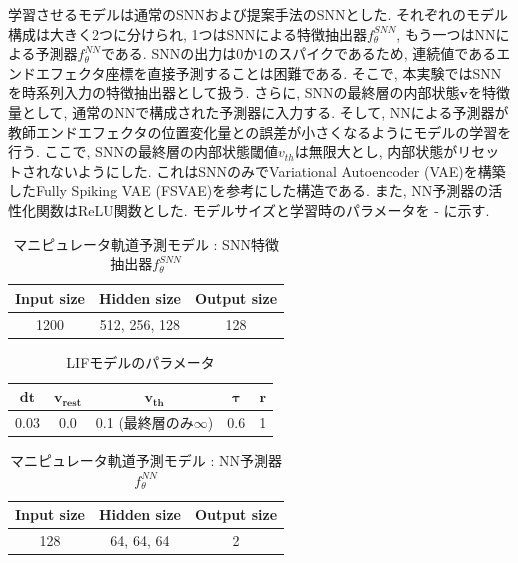 学習させるモデルは通常のSNNおよび提案手法のSNNとした.
それぞれのモデル構成は大きく2つに分けられ, 1つはSNNによる特徴抽出器$f_{\theta}^{SNN}$, もう一つはNNによる予測器$f_{\theta}^{NN}$である.
SNNの出力は0か1のスパイクであるため, 連続値であるエンドエフェクタ座標を直接予測することは困難である.
そこで, 本実験ではSNNを時系列入力の特徴抽出器として扱う.
さらに, SNNの最終層の内部状態$\bm{v}$を特徴量として, 通常のNNで構成された予測器に入力する.
そして, NNによる予測器が教師エンドエフェクタの位置変化量との誤差が小さくなるようにモデルの学習を行う.
ここで, SNNの最終層の内部状態閾値$v_{th}$は無限大とし, 内部状態がリセットされないようにした.
これはSNNのみでVariational Autoencoder (VAE)を構築したFully Spiking VAE (FSVAE)\cite{fsvae}を参考にした構造である.
また, NN予測器の活性化関数はReLU関数とした.
モデルサイズと学習時のパラメータを - に示す.
\begin{table}[htb] %
    \centering
    \caption{マニピュレータ軌道予測モデル : SNN特徴抽出器$f_{\theta}^{SNN}$}
    \label{tab:exp3:model:snn}
    \begin{tabular}{ccc}
        \hline
        \textbf{Input size}& \textbf{Hidden size} & \textbf{Output size}\\
        \hline
        1200   & 512, 256, 128 & 128 \\
        \hline
    \end{tabular}
\end{table}

\begin{table}[htb]
    \centering
    \caption{LIFモデルのパラメータ}
    \label{tab:exp3:model:parameter:lif}
    \begin{tabular}{ccccc}
        \hline
        $\bm{dt}$& $\bm{v_{rest}}$ & $\bm{v_{th}}$ & $\bm{\tau}$ & $\bm{r}$\\
        \hline
        0.03   & 0.0 & 0.1 (最終層のみ$\infty$) & 0.6 & 1 \\
        \hline
    \end{tabular}
\end{table}

\begin{table}[htb] %
    \centering
    \caption{マニピュレータ軌道予測モデル : NN予測器$f_{\theta}^{NN}$}
    \label{tab:exp3:model:nn}
    \begin{tabular}{ccc}
        \hline
        \textbf{Input size}& \textbf{Hidden size} & \textbf{Output size}\\
        \hline
        128   & 64, 64, 64 & 2 \\
        \hline
    \end{tabular}
\end{table}

